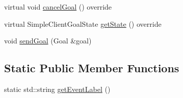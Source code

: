 \begin{DoxyCompactItemize}
\item 
virtual void \hyperlink{classsmacc_1_1client__bases_1_1SmaccActionClientBase_aedeaf9704b73bf05b5522f7250416c9a}{cancel\+Goal} () override
\item 
virtual Simple\+Client\+Goal\+State \hyperlink{classsmacc_1_1client__bases_1_1SmaccActionClientBase_a97192acd7bb7cac5de0191e700ab72ee}{get\+State} () override
\item 
void \hyperlink{classsmacc_1_1client__bases_1_1SmaccActionClientBase_a9c47a5094ac8afb01680307fe5eca922}{send\+Goal} (Goal \&goal)
\end{DoxyCompactItemize}
\subsection*{Static Public Member Functions}
\begin{DoxyCompactItemize}
\item 
static std\+::string \hyperlink{classsmacc_1_1client__bases_1_1SmaccActionClientBase_a283e68df89e8f40d2f3251cbdbff1430}{get\+Event\+Label} ()
\end{DoxyCompactItemize}
